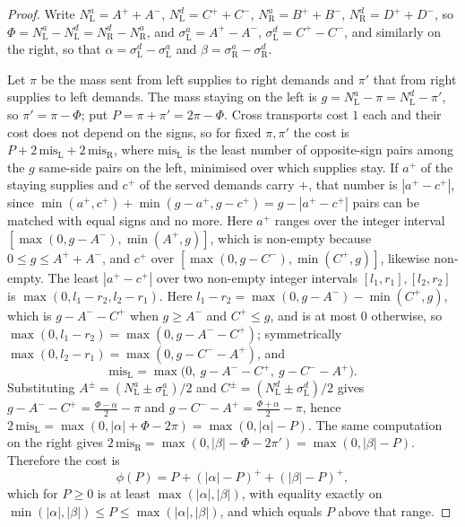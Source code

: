 \documentclass[11pt]{article}
\theoremstyle{plain}
\theoremstyle{definition}
\theoremstyle{remark}
\begin{document}
\begin{proof}
Write $N^a_{\mathrm L}=A^++A^-$, $N^d_{\mathrm L}=C^++C^-$, $N^a_{\mathrm R}=B^++B^-$,
$N^d_{\mathrm R}=D^++D^-$, so $\Phi=N^a_{\mathrm L}-N^d_{\mathrm L}=N^d_{\mathrm R}-N^a_{\mathrm R}$,
and $\sigma^a_{\mathrm L}=A^+-A^-$, $\sigma^d_{\mathrm L}=C^+-C^-$, and similarly on the right, so
that $\alpha=\sigma^d_{\mathrm L}-\sigma^a_{\mathrm L}$ and
$\beta=\sigma^a_{\mathrm R}-\sigma^d_{\mathrm R}$.

Let $\pi$ be the mass sent from left supplies to right demands and $\pi'$ that from right supplies
to left demands. The mass staying on the left is $g=N^a_{\mathrm L}-\pi=N^d_{\mathrm L}-\pi'$, so
$\pi'=\pi-\Phi$; put $P=\pi+\pi'=2\pi-\Phi$. Cross transports cost $1$ each and their cost does not
depend on the signs, so for fixed $\pi,\pi'$ the cost is $P+2\,\mathrm{mis}_{\mathrm L}
+2\,\mathrm{mis}_{\mathrm R}$, where $\mathrm{mis}_{\mathrm L}$ is the least number of opposite-sign
pairs among the $g$ same-side pairs on the left, minimised over which supplies stay. If $a^+$ of the
staying supplies and $c^+$ of the served demands carry $+$, that number is $|a^+-c^+|$, since
$\min(a^+,c^+)+\min(g-a^+,g-c^+)=g-|a^+-c^+|$ pairs can be matched with equal signs and no more.
Here $a^+$ ranges over the integer interval $[\max(0,g-A^-),\min(A^+,g)]$, which is non-empty
because $0\le g\le A^++A^-$, and $c^+$ over $[\max(0,g-C^-),\min(C^+,g)]$, likewise non-empty. The
least $|a^+-c^+|$ over two non-empty integer intervals $[l_1,r_1],[l_2,r_2]$ is
$\max(0,l_1-r_2,l_2-r_1)$. Here $l_1-r_2=\max(0,g-A^-)-\min(C^+,g)$, which is $g-A^--C^+$ when
$g\ge A^-$ and $C^+\le g$, and is at most $0$ otherwise, so
$\max(0,l_1-r_2)=\max(0,g-A^--C^+)$; symmetrically $\max(0,l_2-r_1)=\max(0,g-C^--A^+)$, and
\[
   \mathrm{mis}_{\mathrm L}=\max\bigl(0,\ g-A^--C^+,\ g-C^--A^+\bigr).
\]
Substituting $A^\pm=(N^a_{\mathrm L}\pm\sigma^a_{\mathrm L})/2$ and
$C^\pm=(N^d_{\mathrm L}\pm\sigma^d_{\mathrm L})/2$ gives
$g-A^--C^+=\tfrac{\Phi-\alpha}2-\pi$ and $g-C^--A^+=\tfrac{\Phi+\alpha}2-\pi$, hence
$2\,\mathrm{mis}_{\mathrm L}=\max(0,|\alpha|+\Phi-2\pi)=\max(0,|\alpha|-P)$. The same computation on
the right gives $2\,\mathrm{mis}_{\mathrm R}=\max(0,|\beta|-\Phi-2\pi')=\max(0,|\beta|-P)$.
Therefore the cost is
\[
   \phi(P)=P+(|\alpha|-P)^++(|\beta|-P)^+ ,
\]
which for $P\ge0$ is at least $\max(|\alpha|,|\beta|)$, with equality exactly on
$\min(|\alpha|,|\beta|)\le P\le\max(|\alpha|,|\beta|)$, and which equals $P$ above that range.


\end{proof}
\end{document}
